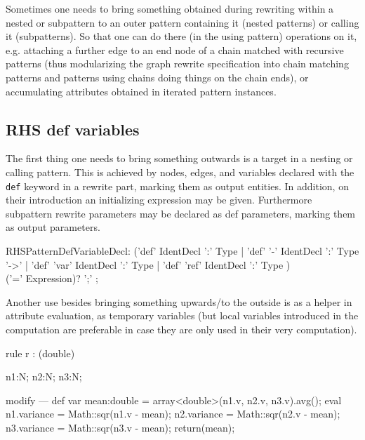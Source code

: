 Sometimes one needs to bring something obtained during rewriting within a nested or subpattern to an outer pattern containing it (nested patterns) or calling it (subpatterns).
So that one can do there (in the using pattern) operations on it, e.g. attaching a further edge to an end node of a chain matched with recursive patterns (thus modularizing the graph rewrite specification into chain matching patterns and patterns using chains doing things on the chain ends), or accumulating attributes obtained in iterated pattern instances. 

\subsection{RHS def variables} 

The first thing one needs to bring something outwards is a target in a nesting or calling pattern. 
This is achieved by nodes, edges, and variables declared with the \texttt{def} keyword in a rewrite part, marking them as output entities.
In addition, on their introduction an initializing expression may be given.
Furthermore subpattern rewrite parameters may be declared as def parameters,
marking them as output parameters.

\begin{rail} 
  RHSPatternDefVariableDecl: 
	('def' IdentDecl ':' Type |
	'def' '-' IdentDecl ':' Type '->' |
	'def' 'var' IdentDecl ':' Type |
	'def' 'ref' IdentDecl ':' Type ) \\
	('=' Expression)? ';'
	;
\end{rail}

Another use besides bringing something upwards/to the outside is as a helper in attribute evaluation,
as temporary variables (but local variables introduced in the computation are preferable in case they are only used in their very computation).

\begin{example}
  \begin{grgen}
rule r : (double) {
  n1:N; n2:N; n3:N;
  
  modify {
  ---
    def var mean:double = array<double>(n1.v, n2.v, n3.v).avg();
    eval {
      n1.variance = Math::sqr(n1.v - mean); 
      n2.variance = Math::sqr(n2.v - mean); 
      n3.variance = Math::sqr(n3.v - mean); 
    }
    return(mean);
  }
}
  \end{grgen}
\end{example}

